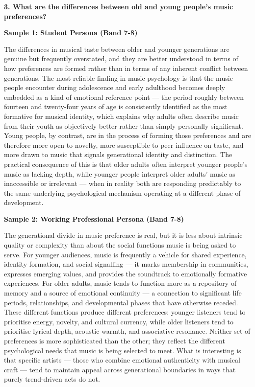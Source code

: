\separator

\begin{ieltsquestion}
\textbf{3. What are the differences between old and young people's music preferences?}
\end{ieltsquestion}
\textbf{Sample 1: Student Persona (Band 7-8)}

The differences in musical taste between older and younger generations are genuine but frequently overstated, and they are better understood in terms of how preferences are formed rather than in terms of any inherent conflict between generations. The most reliable finding in music psychology is that the music people encounter during adolescence and early adulthood becomes deeply embedded as a kind of emotional reference point — the period roughly between fourteen and twenty-four years of age is consistently identified as the most formative for musical identity, which explains why adults often describe music from their youth as objectively better rather than simply personally significant. Young people, by contrast, are in the process of forming those preferences and are therefore more open to novelty, more susceptible to peer influence on taste, and more drawn to music that signals generational identity and distinction. The practical consequence of this is that older adults often interpret younger people's music as lacking depth, while younger people interpret older adults' music as inaccessible or irrelevant — when in reality both are responding predictably to the same underlying psychological mechanism operating at a different phase of development.

\textbf{Sample 2: Working Professional Persona (Band 7-8)}

The generational divide in music preference is real, but it is less about intrinsic quality or complexity than about the social functions music is being asked to serve. For younger audiences, music is frequently a vehicle for shared experience, identity formation, and social signalling — it marks membership in communities, expresses emerging values, and provides the soundtrack to emotionally formative experiences. For older adults, music tends to function more as a repository of memory and a source of emotional continuity — a connection to significant life periods, relationships, and developmental phases that have otherwise receded. These different functions produce different preferences: younger listeners tend to prioritise energy, novelty, and cultural currency, while older listeners tend to prioritise lyrical depth, acoustic warmth, and associative resonance. Neither set of preferences is more sophisticated than the other; they reflect the different psychological needs that music is being selected to meet. What is interesting is that specific artists — those who combine emotional authenticity with musical craft — tend to maintain appeal across generational boundaries in ways that purely trend-driven acts do not.

